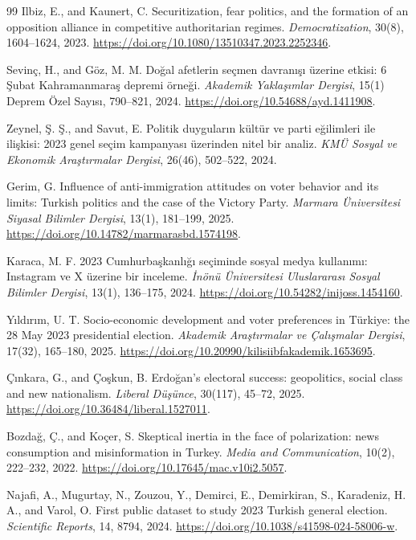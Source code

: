 \documentclass[pdflatex,sn-mathphys-num,iicol]{sn-jnl}
\begin{document}
\begin{thebibliography}{99}
Ilbiz, E., and Kaunert, C.
Securitization, fear politics, and the formation of an opposition alliance in competitive authoritarian regimes.
\textit{Democratization}, 30(8), 1604--1624, 2023.
\url{https://doi.org/10.1080/13510347.2023.2252346}.

Sevinç, H., and Göz, M. M.
Doğal afetlerin seçmen davranışı üzerine etkisi: 6 Şubat Kahramanmaraş depremi örneği.
\textit{Akademik Yaklaşımlar Dergisi}, 15(1) Deprem Özel Sayısı, 790--821, 2024.
\url{https://doi.org/10.54688/ayd.1411908}.

Zeynel, Ş. Ş., and Savut, E.
Politik duyguların kültür ve parti eğilimleri ile ilişkisi: 2023 genel seçim kampanyası üzerinden nitel bir analiz.
\textit{KMÜ Sosyal ve Ekonomik Araştırmalar Dergisi}, 26(46), 502--522, 2024.

Gerim, G.
Influence of anti-immigration attitudes on voter behavior and its limits: Turkish politics and the case of the Victory Party.
\textit{Marmara Üniversitesi Siyasal Bilimler Dergisi}, 13(1), 181--199, 2025.
\url{https://doi.org/10.14782/marmarasbd.1574198}.

Karaca, M. F.
2023 Cumhurbaşkanlığı seçiminde sosyal medya kullanımı: Instagram ve X üzerine bir inceleme.
\textit{İnönü Üniversitesi Uluslararası Sosyal Bilimler Dergisi}, 13(1), 136--175, 2024.
\url{https://doi.org/10.54282/inijoss.1454160}.

Yıldırım, U. T.
Socio-economic development and voter preferences in Türkiye: the 28 May 2023 presidential election.
\textit{Akademik Araştırmalar ve Çalışmalar Dergisi}, 17(32), 165--180, 2025.
\url{https://doi.org/10.20990/kilisiibfakademik.1653695}.

Çınkara, G., and Çoşkun, B.
Erdoğan's electoral success: geopolitics, social class and new nationalism.
\textit{Liberal Düşünce}, 30(117), 45--72, 2025.
\url{https://doi.org/10.36484/liberal.1527011}.

Bozdağ, Ç., and Koçer, S.
Skeptical inertia in the face of polarization: news consumption and misinformation in Turkey.
\textit{Media and Communication}, 10(2), 222--232, 2022.
\url{https://doi.org/10.17645/mac.v10i2.5057}.

Najafi, A., Mugurtay, N., Zouzou, Y., Demirci, E., Demirkiran, S., Karadeniz, H. A., and Varol, O.
First public dataset to study 2023 Turkish general election.
\textit{Scientific Reports}, 14, 8794, 2024.
\url{https://doi.org/10.1038/s41598-024-58006-w}.


\end{thebibliography}
\end{document}
